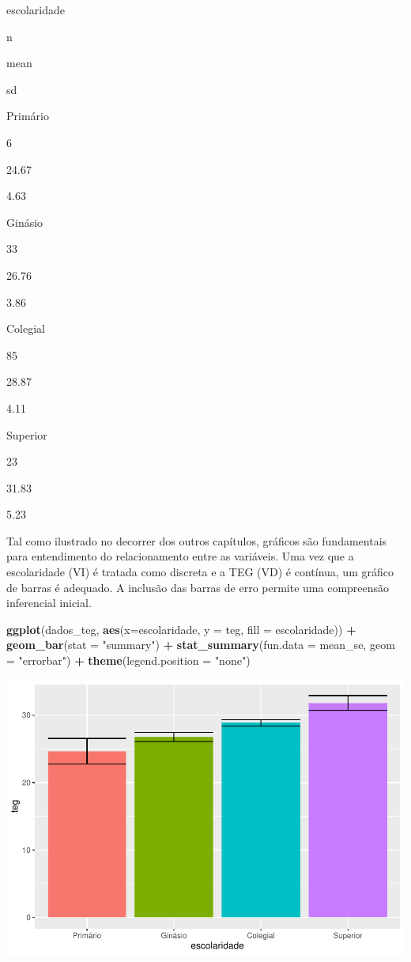 \documentclass[
]{book}
\newenvironment{Shaded}{\begin{snugshade}}{\end{snugshade}}
\newcommand{\DataTypeTok}[1]{\textcolor[rgb]{0.13,0.29,0.53}{#1}}
\newcommand{\KeywordTok}[1]{\textcolor[rgb]{0.13,0.29,0.53}{\textbf{#1}}}
\newcommand{\NormalTok}[1]{#1}
\newcommand{\OperatorTok}[1]{\textcolor[rgb]{0.81,0.36,0.00}{\textbf{#1}}}
\newcommand{\StringTok}[1]{\textcolor[rgb]{0.31,0.60,0.02}{#1}}
\begin{document}
escolaridade

n

mean

sd

Primário

6

24.67

4.63

Ginásio

33

26.76

3.86

Colegial

85

28.87

4.11

Superior

23

31.83

5.23

Tal como ilustrado no decorrer dos outros capítulos, gráficos são fundamentais para entendimento do relacionamento entre as variáveis. Uma vez que a escolaridade (VI) é tratada como discreta e a TEG (VD) é contínua, um gráfico de barras é adequado. A inclusão das barras de erro permite uma compreensão inferencial inicial.

\begin{Shaded}
\begin{Highlighting}[]
\KeywordTok{ggplot}\NormalTok{(dados_teg, }\KeywordTok{aes}\NormalTok{(}\DataTypeTok{x=}\NormalTok{escolaridade, }\DataTypeTok{y =}\NormalTok{ teg, }\DataTypeTok{fill =}\NormalTok{ escolaridade)) }\OperatorTok{+}
\StringTok{  }\KeywordTok{geom_bar}\NormalTok{(}\DataTypeTok{stat =} \StringTok{"summary"}\NormalTok{) }\OperatorTok{+}
\StringTok{  }\KeywordTok{stat_summary}\NormalTok{(}\DataTypeTok{fun.data =}\NormalTok{ mean_se, }\DataTypeTok{geom =} \StringTok{"errorbar"}\NormalTok{) }\OperatorTok{+}
\StringTok{  }\KeywordTok{theme}\NormalTok{(}\DataTypeTok{legend.position =} \StringTok{"none"}\NormalTok{)}
\end{Highlighting}
\end{Shaded}

\begin{center}\includegraphics{gitbook-demo_files/figure-latex/unnamed-chunk-52-1} \end{center}
\end{document}
